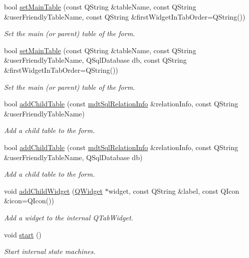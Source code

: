 \begin{DoxyCompactItemize}
bool \hyperlink{classmdt_sql_form_abe4cc1a317d8e76aed7b408184c8712e}{set\-Main\-Table} (const Q\-String \&table\-Name, const Q\-String \&user\-Friendly\-Table\-Name, const Q\-String \&first\-Widget\-In\-Tab\-Order=Q\-String())
\begin{DoxyCompactList}\small\item\em Set the main (or parent) table of the form. \end{DoxyCompactList}\item 
bool \hyperlink{classmdt_sql_form_aee00ca6122b6a18a72b861e691fd035a}{set\-Main\-Table} (const Q\-String \&table\-Name, const Q\-String \&user\-Friendly\-Table\-Name, Q\-Sql\-Database db, const Q\-String \&first\-Widget\-In\-Tab\-Order=Q\-String())
\begin{DoxyCompactList}\small\item\em Set the main (or parent) table of the form. \end{DoxyCompactList}\item 
bool \hyperlink{classmdt_sql_form_a9c48a7af83effbc50e9171a8d7ff3889}{add\-Child\-Table} (const \hyperlink{classmdt_sql_relation_info}{mdt\-Sql\-Relation\-Info} \&relation\-Info, const Q\-String \&user\-Friendly\-Table\-Name)
\begin{DoxyCompactList}\small\item\em Add a child table to the form. \end{DoxyCompactList}\item 
bool \hyperlink{classmdt_sql_form_a0ffbb237eef4cb3b4e9b458860ef411d}{add\-Child\-Table} (const \hyperlink{classmdt_sql_relation_info}{mdt\-Sql\-Relation\-Info} \&relation\-Info, const Q\-String \&user\-Friendly\-Table\-Name, Q\-Sql\-Database db)
\begin{DoxyCompactList}\small\item\em Add a child table to the form. \end{DoxyCompactList}\item 
void \hyperlink{classmdt_sql_form_a86174e002c2dd5496ab74a7eb67c614c}{add\-Child\-Widget} (\hyperlink{class_q_widget}{Q\-Widget} $\ast$widget, const Q\-String \&label, const Q\-Icon \&icon=Q\-Icon())
\begin{DoxyCompactList}\small\item\em Add a widget to the internal Q\-Tab\-Widget. \end{DoxyCompactList}\item 
void \hyperlink{classmdt_sql_form_a101b73d24864dd208968ca6dfe5f8cd8}{start} ()
\begin{DoxyCompactList}\small\item\em Start internal state machines. \end{DoxyCompactList}\item 

\end{DoxyCompactItemize}
